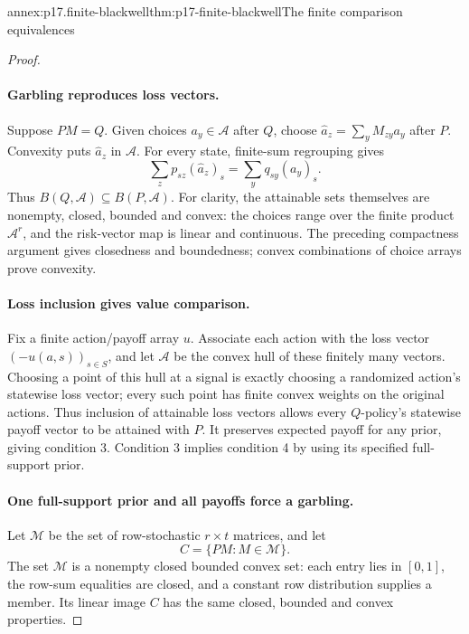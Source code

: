 \begin{annexitem}{annex:p17.finite-blackwell}{thm:p17-finite-blackwell}{The finite comparison equivalences}
\begin{proof}
\paragraph{Garbling reproduces loss vectors.}
Suppose \(PM=Q\). Given choices \(a_y\in\mathcal A\) after \(Q\),
choose \(\widehat a_z=\sum_yM_{zy}a_y\) after \(P\).
Convexity puts \(\widehat a_z\) in \(\mathcal A\).
For every state, finite-sum regrouping gives
\[
 \sum_zp_{sz}(\widehat a_z)_s
       =\sum_yq_{sy}(a_y)_s.
\]
Thus \(B(Q,\mathcal A)\subseteq B(P,\mathcal A)\).
For clarity, the attainable sets themselves are nonempty, closed,
bounded and convex: the choices range over the finite product
\(\mathcal A^r\), and the risk-vector map is linear and continuous.
The preceding compactness argument gives closedness and boundedness;
convex combinations of choice arrays prove convexity.

\paragraph{Loss inclusion gives value comparison.}
Fix a finite action/payoff array \(u\). Associate each action with
the loss vector \((-u(a,s))_{s\in S}\), and let \(\mathcal A\)
be the convex hull of these finitely many vectors. Choosing a point
of this hull at a signal is exactly choosing a randomized action's
statewise loss vector; every such point has finite convex weights
on the original actions. Thus inclusion of attainable loss vectors
allows every \(Q\)-policy's statewise payoff vector to be attained
with \(P\). It preserves expected payoff for any prior, giving
condition 3. Condition 3 implies condition 4 by using its specified
full-support prior.

\paragraph{One full-support prior and all payoffs force a garbling.}
Let \(\mathcal M\) be the set of row-stochastic \(r\times t\) matrices,
and let
\[
                         C=\{PM:M\in\mathcal M\}.
\]
The set \(\mathcal M\) is a nonempty closed bounded convex set:
each entry lies in \([0,1]\), the row-sum equalities are closed,
and a constant row distribution supplies a member.
Its linear image \(C\) has the same closed, bounded and convex properties.


\end{proof}
\end{annexitem}

